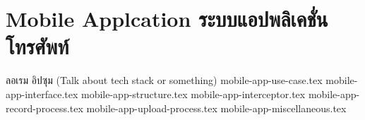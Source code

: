 \section{\ifenglish Mobile Applcation \else ระบบแอปพลิเคชั่นโทรศัพท์ \fi}
\ifenglish
\else
ลอเรม อิปซุม (Talk about tech stack or something) 
\fi
\newcommand{\dir}{chapters/approach/mobile-app}
{mobile-app-use-case.tex}
{mobile-app-interface.tex}
{mobile-app-structure.tex}
{mobile-app-interceptor.tex}
{mobile-app-record-process.tex}
{mobile-app-upload-process.tex}
{mobile-app-miscellaneous.tex}